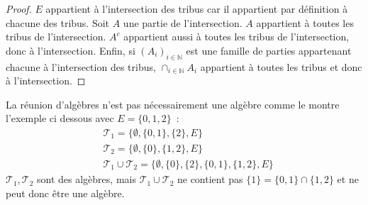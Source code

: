 \begin{proof}
$E$ appartient à l'intersection des tribus car il appartient par définition
à chacune des tribus. Soit $A$ une partie de l'intersection. $A$ appartient à toutes
les tribus de l'intersection. $A^c$ appartient aussi à toutes les tribus
de l'intersection, donc à l'intersection. Enfin, si $(A_i)_{i \in \mathbb{N}}$ est une famille de parties
appartenant chacune à l'intersection des tribus, $\cap_{i \in \mathbb{N}} A_i$ appartient à toutes
les tribus et donc à l'intersection.
\end{proof}
La réunion d'algèbres n'est pas nécessairement une algèbre comme le
montre l'exemple ci dessous avec $E= \{ 0, 1, 2 \}$~:
\begin{align*}
&\mathcal{T}_1 = \{ \emptyset, \{ 0,1 \}, \{ 2\}, E \} \\
&\mathcal{T}_2 = \{ \emptyset, \{ 0\}, \{1, 2\}, E \} \\
& \mathcal{T}_1 \cup \mathcal{T}_2 = \{ \emptyset, \{ 0\}, \{ 2\},  \{ 0,1
\},\{1, 2\}, E \}
\end{align*}
$\mathcal{T}_1, \mathcal{T}_2$ sont des algèbres, mais $ \mathcal{T}_1
\cup \mathcal{T}_2$ ne contient pas $\{1\} = \{ 0,1 \} \cap \{1, 2\}$
et ne peut donc être une algèbre.

